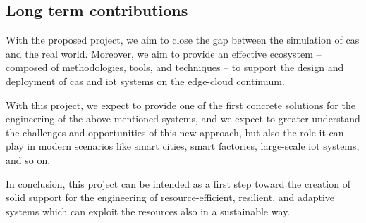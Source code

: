 \documentclass[12pt]{article}
\newcommand{\meta}[1]{{\color{blue}#1}}
\begin{document}
\subsection{Long term contributions}
\meta{
With the proposed project, we aim to close the gap between the simulation of \ac{cas} and the real world.
%
Moreover, we aim to provide an effective ecosystem -- composed of methodologies, tools, and techniques --
to support the design and deployment of \ac{cas} and \ac{iot} systems on the edge-cloud continuum.

With this project,
we expect to provide one of the first concrete solutions for the engineering of the above-mentioned systems,
and we expect to greater understand the challenges and opportunities of this new approach,
but also the role it can play in modern scenarios like smart cities, smart factories, large-scale \ac{iot} systems, and so on.

In conclusion,
this project can be intended as a first step toward the creation of solid support
for the engineering of resource-efficient, resilient, and adaptive systems
which can exploit the resources also in a sustainable way.
}

\newpage

\printbibliography
\end{document}
